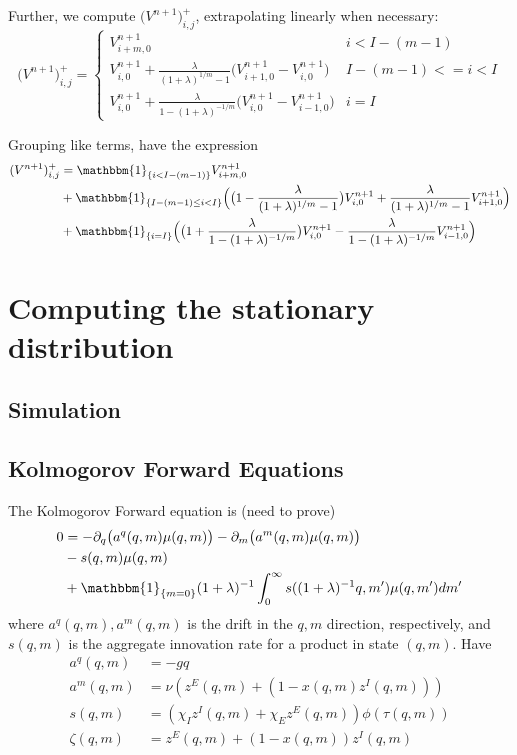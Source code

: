 \documentclass[12pt,english]{article}
\theoremstyle{remark}
\begin{document}
Further, we compute $\big(V^{n+1}\big)^+_{i,j}$, extrapolating linearly when necessary:
\[ \big(V^{n+1}\big)^+_{i,j} = \begin{cases} 
V^{n+1}_{i+m,0} & i < I - (m-1) \\
V^{n+1}_{i,0} + \frac{\lambda}{(1+\lambda)^{1/m} -1}\big( V^{n+1}_{i+1,0} - V^{n+1}_{i,0} \big) & I - (m-1) <= i < I \\
V^{n+1}_{i,0} + \frac{\lambda}{1-(1+\lambda)^{-1/m}}\big( V^{n+1}_{i,0} - V^{n+1}_{i-1,0} \big) & i = I 

\end{cases}
\]

Grouping like terms, have the expression 
\begin{align*}
(V^{n+1})^+_{i,j} &= \mathbbm{1}_{\{i<I-(m-1)\}} V_{i+m,0}^{n+1} \\
&+ \mathbbm{1}_{\{I-(m-1) \le i < I\}} \Big(  \big(1-\frac{\lambda}{(1+\lambda)^{1/m} - 1}\big) V_{i,0}^{n+1} + \frac{\lambda}{(1+\lambda)^{1/m}-1} V_{i+1,0}^{n+1}  \Big) \\
&+ \mathbbm{1}_{\{i=I\}} \Big( \big( 1 + \frac{\lambda}{1-(1+\lambda)^{-1/m}} \big) V_{i,0}^{n+1} - \frac{\lambda}{1-(1+\lambda)^{-1/m}} V_{i-1,0}^{n+1}  \Big)
\end{align*}

\section{Computing the stationary distribution}

\subsection{Simulation}

\subsection{Kolmogorov Forward Equations}

The Kolmogorov Forward equation is (need to prove)
\begin{align*}
0 &= - \partial_q \big(a^q (q,m) \mu (q,m) \big) - \partial_m \big( a^m (q,m) \mu (q,m) \big) \\
  & - s(q,m) \mu(q,m) \\
  &+ \mathbbm{1}_{\{m=0\}} (1+\lambda)^{-1}\int_0^{\infty} s((1+\lambda)^{-1}q,m') \mu(q,m') dm'  
\end{align*}
where $a^q(q,m),a^m(q,m)$ is the drift in the $q,m$ direction, respectively, and $s(q,m)$ is the aggregate innovation rate for a product in state $(q,m)$. Have 
\begin{align*}
a^q(q,m) &= -gq \\
a^m(q,m) &= \nu (z^E(q,m) + (1-x(q,m) z^I(q,m))) \\ 
s(q,m) &= (\chi_I z^I(q,m) + \chi_E z^E(q,m)) \phi (\tau(q,m)) \\ 
\zeta(q,m) &= z^E(q,m) + (1-x(q,m)) z^I(q,m) 
\end{align*}
\end{document}
